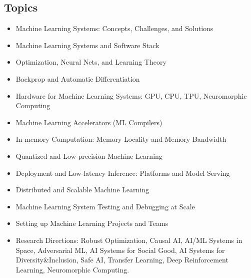 \documentclass[11pt]{article}
\begin{document}
\subsection*{Topics}

\begin{itemize}
\item Machine Learning Systems: Concepts, Challenges, and Solutions
\item Machine Learning Systems and Software Stack
\item Optimization, Neural Nets, and Learning Theory
\item Backprop and Automatic Differentiation
\item Hardware for Machine Learning Systems: GPU, CPU, TPU, Neuromorphic Computing
\item Machine Learning Accelerators (ML Compilers)
\item In-memory Computation: Memory Locality and Memory Bandwidth
\item Quantized and Low-precision Machine Learning
\item Deployment and Low-latency Inference: Platforms and Model Serving
\item Distributed and Scalable Machine Learning
\item Machine Learning System Testing and Debugging at Scale 
\item Setting up Machine Learning Projects and Teams
\item Research Directions: Robust Optimization, Causal AI, AI/ML Systems in Space, Adversarial ML, AI Systems for Social Good, AI Systems for Diversity\&Inclusion, Safe AI, Transfer Learning, Deep Reinforcement Learning, Neuromorphic Computing.
\end{itemize}


\newpage
\end{document}
